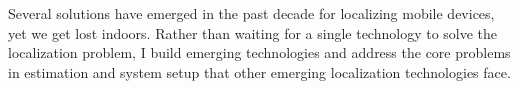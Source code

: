 \documentclass[10pt]{article}
\begin{document}
Several solutions have emerged in the past decade for localizing mobile devices, yet we get lost indoors. 
Rather than waiting for a single technology to solve the localization problem, I build emerging technologies and address the core problems in estimation and system setup that other emerging localization technologies face. %


\end{document}
